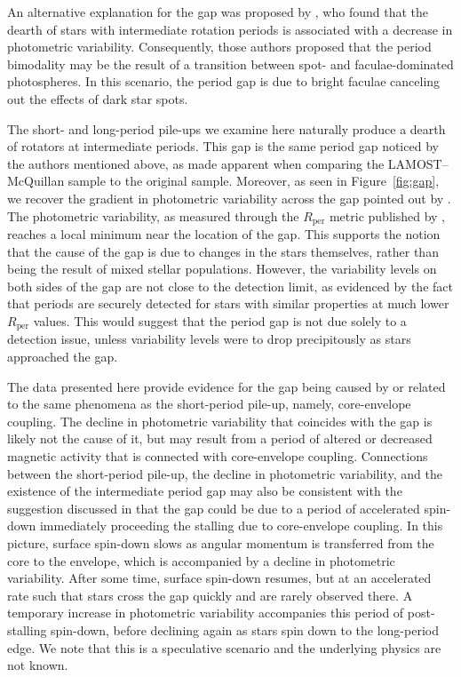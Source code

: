 \documentclass[linenumbers,tighten,trackchanges,twocolumn]{aastex631}
\newcommand{\lamostmcq}{LAMOST--McQuillan\xspace}
\newcommand{\rper}{\ensuremath{R_\mathrm{per}}\xspace}
\begin{document}
An alternative explanation for the gap was proposed by \citet{Reinhold2019}, who found that the dearth of stars with intermediate rotation periods is associated with a decrease in photometric variability. Consequently, those authors proposed that the period bimodality may be the result of a transition between spot- and faculae-dominated photospheres. In this scenario, the period gap is due to bright faculae canceling out the effects of dark star spots. 

The short- and long-period pile-ups we examine here naturally produce a dearth of rotators at intermediate periods. This gap is the same period gap noticed by the authors mentioned above, as made apparent when comparing the \lamostmcq sample to the original \citet{McQuillan2014} sample. Moreover, as seen in Figure~\ref{fig:gap}, we recover the gradient in photometric variability across the gap pointed out by \citet{Reinhold2019}. The photometric variability, as measured through the \rper metric published by \citet{McQuillan2014}, reaches a local minimum near the location of the gap. This supports the notion that the cause of the gap is due to changes in the stars themselves, rather than being the result of mixed stellar populations. However, the variability levels on both sides of the gap are not close to the detection limit, as evidenced by the fact that periods are securely detected for stars with similar properties at much lower \rper values. This would suggest that the period gap is not due solely to a detection issue, unless variability levels were to drop precipitously as stars approached the gap. 

{\color{red} The data presented here provide evidence for the gap being caused by or related to the same phenomena as the short-period pile-up, namely, core-envelope coupling. The decline in photometric variability that coincides with the gap is likely not the cause of it, but may result from a period of altered or decreased magnetic activity that is connected with core-envelope coupling. Connections between the short-period pile-up, the decline in photometric variability, and the existence of the intermediate period gap may also be consistent with the suggestion discussed in \citet{Gordon2021} that the gap could be due to a period of accelerated spin-down immediately proceeding the stalling due to core-envelope coupling. In this picture, surface spin-down slows as angular momentum is transferred from the core to the envelope, which is accompanied by a decline in photometric variability. After some time, surface spin-down resumes, but at an accelerated rate such that stars cross the gap quickly and are rarely observed there. A temporary increase in photometric variability accompanies this period of post-stalling spin-down, before declining again as stars spin down to the long-period edge. We note that this is a speculative scenario and the underlying physics are not known.}
\end{document}
